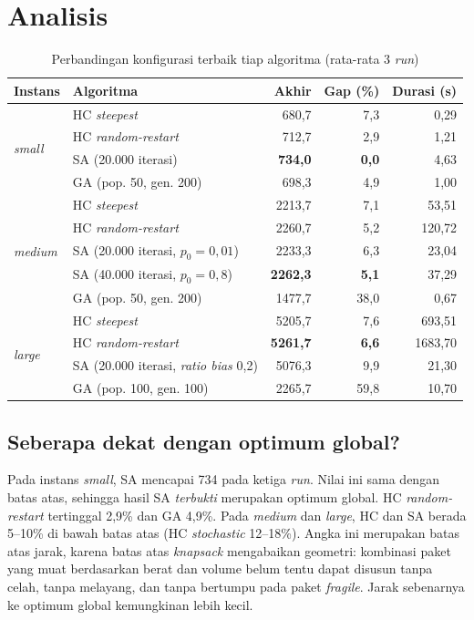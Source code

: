 \section{Analisis}

\begin{table}[H]
	\centering
	\caption{Perbandingan konfigurasi terbaik tiap algoritma (rata-rata 3 \textit{run})}
	\label{tab:compare}
	\begin{tabular}{l l r r r}
		\toprule
		\textbf{Instans} & \textbf{Algoritma} & \textbf{Akhir} & \textbf{Gap (\%)} & \textbf{Durasi (s)} \\
		\midrule
		\multirow{4}{*}{\textit{small}}  & HC \textit{steepest} & 680,7 & 7,3 & 0,29 \\
		& HC \textit{random-restart} & 712,7 & 2,9 & 1,21 \\
		& SA (20.000 iterasi) & \textbf{734,0} & \textbf{0,0} & 4,63 \\
		& GA (pop. 50, gen. 200) & 698,3 & 4,9 & 1,00 \\
		\midrule
		\multirow{5}{*}{\textit{medium}} & HC \textit{steepest} & 2213,7 & 7,1 & 53,51 \\
		& HC \textit{random-restart} & 2260,7 & 5,2 & 120,72 \\
		& SA (20.000 iterasi, $p_0=0{,}01$) & 2233,3 & 6,3 & 23,04 \\
		& SA (40.000 iterasi, $p_0=0{,}8$) & \textbf{2262,3} & \textbf{5,1} & 37,29 \\
		& GA (pop. 50, gen. 200) & 1477,7 & 38,0 & 0,67 \\
		\midrule
		\multirow{4}{*}{\textit{large}}  & HC \textit{steepest} & 5205,7 & 7,6 & 693,51 \\
		& HC \textit{random-restart} & \textbf{5261,7} & \textbf{6,6} & 1683,70 \\
		& SA (20.000 iterasi, \textit{ratio bias} 0,2) & 5076,3 & 9,9 & 21,30 \\
		& GA (pop. 100, gen. 100) & 2265,7 & 59,8 & 10,70 \\
		\bottomrule
	\end{tabular}
\end{table}

\subsection{Seberapa dekat dengan optimum global?}

Pada instans \textit{small}, SA mencapai 734 pada ketiga \textit{run}. Nilai ini sama
dengan batas atas, sehingga hasil SA \emph{terbukti} merupakan optimum global.
HC \textit{random-restart} tertinggal 2,9\% dan GA 4,9\%. Pada \textit{medium} dan
\textit{large}, HC dan SA berada 5--10\% di bawah batas atas (HC \textit{stochastic}
12--18\%). Angka ini merupakan
batas atas jarak, karena batas atas \textit{knapsack} mengabaikan geometri:
kombinasi paket yang muat berdasarkan berat dan volume belum tentu dapat disusun
tanpa celah, tanpa melayang, dan tanpa bertumpu pada paket \textit{fragile}.
Jarak sebenarnya ke optimum global kemungkinan lebih kecil.

